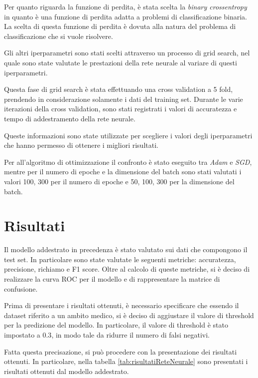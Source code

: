 Per quanto riguarda la funzione di perdita, è stata scelta la \textit{binary
    crossentropy} in quanto è una funzione di perdita adatta a problemi di
classificazione binaria. La scelta di questa funzione di perdita è dovuta alla 
natura del problema di classificazione che si vuole risolvere.

Gli altri iperparametri sono stati scelti attraverso un processo di grid search, 
nel quale sono state valutate le prestazioni della rete neurale al variare di
questi iperparametri. 

Questa fase di grid search è stata effettuando una cross validation a 5 fold,
prendendo in considerazione solamente i dati del training set. Durante le varie
iterazioni della cross validation, sono stati registrati i valori di accuratezza
e tempo di addestramento della rete neurale.

Queste informazioni sono state utilizzate per scegliere i valori degli iperparametri
che hanno permesso di ottenere i migliori risultati.

Per all'algoritmo di ottimizzazione il confronto è stato eseguito tra 
\textit{Adam} e \textit{SGD}, mentre per il numero di epoche e la dimensione
del batch sono stati valutati i valori 100, 300 per il numero di epoche e 50, 
100, 300 per la dimensione del batch.

\section{Risultati}
Il modello addestrato in precedenza è stato valutato sui dati che compongono il
test set. In particolare sono state valutate le seguenti metriche: accuratezza,
precisione, richiamo e F1 score. Oltre al calcolo di queste metriche, si è 
deciso di realizzare la curva ROC per il modello e di rappresentare la matrice
di confusione.

Prima di presentare i risultati ottenuti, è necessario specificare che essendo 
il dataset riferito a un ambito medico, si è deciso di aggiustare il valore di
threshold per la predizione del modello. In particolare, il valore di threshold
è stato impostato a $0.3$, in modo tale da ridurre il numero di falsi negativi.

Fatta questa precisazione, si può procedere con la presentazione dei risultati
ottenuti. In particolare, nella tabella \ref{tab:risultatiReteNeurale} sono
presentati i risultati ottenuti dal modello addestrato.

